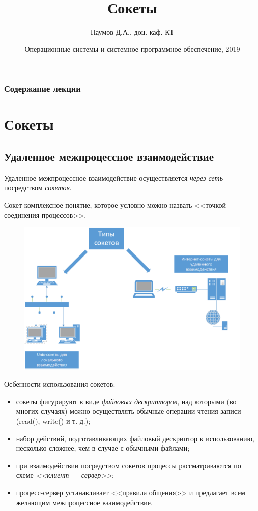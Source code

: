 \documentclass{beamer}
\title[Межпроцессное взаимодействие]{Сокеты}
\author{Наумов Д.А., доц. каф. КТ}
\date[26.11.2019] {Операционные системы и системное программное обеспечение, 2019}
\begin{document}
\begin{frame}
  \titlepage
\end{frame}
  
\begin{frame}
  \frametitle{Содержание лекции}
  \tableofcontents  
\end{frame}

\section{Сокеты}

\subsection{Удаленное межпроцессное взаимодействие}

\begin{frame}
	Удаленное межпроцессное взаимодействие осуществляется \textit{через сеть} посредством \textit{сокетов}.
	\begin{block}{Сокет}
		комплексное понятие, которое условно можно назвать <<точкой соединения процессов>>.
	\end{block}
	\begin{figure}[h]
		\centering
	\includegraphics[scale=0.35]{images/lec12-pic01.png}
	\end{figure}
\end{frame}

\begin{frame}
Осбенности использования сокетов:
\begin{itemize}
\item сокеты фигурируют в виде \textit{файловых дескрипторов}, над которыми (во многих случаях) можно осуществлять обычные операции чтения-записи (read(), write() и т. д.);
\item набор действий, подготавливающих файловый дескриптор к использованию, несколько сложнее, чем в случае с обычными файлами;
\item при взаимодействии посредством сокетов процессы рассматриваются по схеме \textit{<<клиент — сервер>>};
\item процесс-сервер устанавливает <<правила общения>> и предлагает всем желающим межпроцессное взаимодействие.
\end{itemize}
\end{frame}
\end{document}
